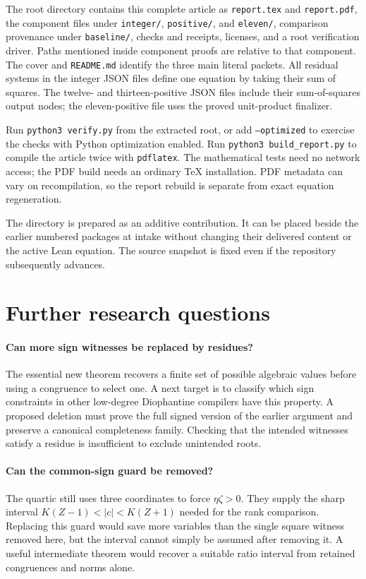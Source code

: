 \documentclass[11pt,letterpaper]{article}
\theoremstyle{remark}
\begin{document}
The root directory contains this complete article as \texttt{report.tex}
and \texttt{report.pdf}, the component files under \texttt{integer/},
\texttt{positive/}, and \texttt{eleven/}, comparison provenance under \texttt{baseline/},
checks and receipts, licenses, and a root verification driver.  Paths
mentioned inside component proofs are relative to that component.
The cover and \texttt{README.md} identify the three main literal packets.
All residual systems in the integer JSON files define one equation by
taking their sum of squares.  The twelve- and thirteen-positive JSON
files include their sum-of-squares output nodes; the eleven-positive
file uses the proved unit-product finalizer.

Run \texttt{python3 verify.py} from the extracted root, or add
\texttt{--optimized} to exercise the checks with Python optimization
enabled.  Run \texttt{python3 build\_report.py} to compile the article
twice with \texttt{pdflatex}.  The mathematical tests need no network
access; the PDF build needs an ordinary TeX installation.  PDF metadata
can vary on recompilation, so the report rebuild is separate from exact
equation regeneration.

The directory is prepared as an additive contribution.  It can be placed
beside the earlier numbered packages at intake without changing their
delivered content or the active Lean equation.  The source snapshot is
fixed even if the repository subsequently advances.

\section{Further research questions}
\label{sec:future}

\paragraph{Can more sign witnesses be replaced by residues?}
The essential new theorem recovers a finite set of possible algebraic
values before using a congruence to select one.  A next target is to
classify which sign constraints in other low-degree Diophantine
compilers have this property.  A proposed deletion must prove the full
signed version of the earlier argument and preserve a canonical
completeness family.  Checking that the intended witnesses satisfy a
residue is insufficient to exclude unintended roots.

\paragraph{Can the common-sign guard be removed?}
The quartic still uses three coordinates to force
$\eta\zeta>0$.  They supply the sharp interval
$K(Z-1)<|c|<K(Z+1)$ needed for the rank comparison.  Replacing this
guard would save more variables than the single square witness removed
here, but the interval cannot simply be assumed after removing it.
A useful intermediate theorem would recover a suitable ratio interval
from retained congruences and norms alone.
\end{document}
